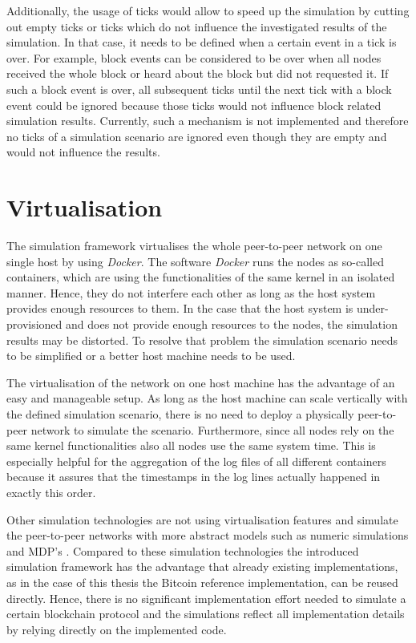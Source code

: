 Additionally, the usage of ticks would allow to speed up the simulation by cutting out empty ticks or ticks which do not influence the investigated results of the simulation.
In that case, it needs to be defined when a certain event in a tick is over.
For example, block events can be considered to be over when all nodes received the whole block or heard about the block but did not requested it.
If such a block event is over, all subsequent ticks until the next tick with a block event could be ignored because those ticks would not influence block related simulation results.
Currently, such a mechanism is not implemented and therefore no ticks of a simulation scenario are ignored even though they are empty and would not influence the results.

\section{Virtualisation}
\label{chap:virtualisation}

The simulation framework virtualises the whole peer-to-peer network on one single host by using \textit{Docker}.
The software \textit{Docker} runs the nodes as so-called containers, which are using the functionalities of the same kernel in an isolated manner.
Hence, they do not interfere each other as long as the host system provides enough resources to them.
In the case that the host system is under-provisioned and does not provide enough resources to the nodes, the simulation results may be distorted.
To resolve that problem the simulation scenario needs to be simplified or a better host machine needs to be used.

The virtualisation of the network on one host machine has the advantage of an easy and manageable setup.
As long as the host machine can scale vertically with the defined simulation scenario, there is no need to deploy a physically peer-to-peer network to simulate the scenario.
Furthermore, since all nodes rely on the same kernel functionalities also all nodes use the same system time.
This is especially helpful for the aggregation of the log files of all different containers because it assures that the timestamps in the log lines actually happened in exactly this order.

Other simulation technologies are not using virtualisation features and simulate the peer-to-peer networks with more abstract models such as numeric simulations and MDP's \cite{eyal2014majority, bahack2013theoretical, gervais2015tampering, nayak2016stubborn, sapirshtein2016optimal, gervais2016security}. Compared to these simulation technologies the introduced simulation framework has the advantage that already existing implementations, as in the case of this thesis the Bitcoin reference implementation, can be reused directly.
Hence, there is no significant implementation effort needed to simulate a certain blockchain protocol and the simulations reflect all implementation details by relying directly on the implemented code.

